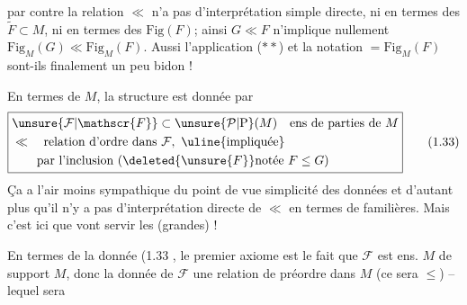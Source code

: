 par contre la relation $\ll$ n'a pas d'interprétation simple directe, ni en termes des  $\widetilde F\subset M$, ni en termes des  $\mathrm{Fig}(F)$; ainsi $G\ll F$ n'implique nullement $\mathrm{Fig}_{M}(G)\ll\mathrm{Fig}_{M}(F)$. Aussi l'application ($**$) et la notation $=\mathrm{Fig}_{M}(F)$ sont-ils finalement un peu bidon !

En termes de $M$, la structure est donnée par
\[
\boxed{\begin{aligned}
&\unsure{\mathcal{F}|\mathscr{F}}\subset\unsure{\mathcal{P}|\mathrm{P}}(M)\quad\text{ens de parties de }M\\
&\ll\quad\text{relation d'ordre dans }\mathcal{F},\ \text{\uline{impliquée}}\\
&\qquad\text{par l'inclusion }(\deleted{\unsure{F}}\text{notée }F\leq G)
\end{aligned}}
\tag*{(1.33)}
\]
Ça a l'air moins sympathique du point de vue simplicité des données et d'autant plus qu'il n'y a pas  d'interprétation directe de $\ll$ en termes de   familières. Mais c'est ici que vont servir les (grandes)  !

En termes de la  donnée (1.33\unsure{)|]} , le  premier axiome est  le fait que $\mathcal{F}$ est  ens.   $M$ de
 support $M$,  donc la donnée de
$\mathcal{F}$   une relation de préordre dans $M$ (ce sera $\leq$) -- lequel sera

